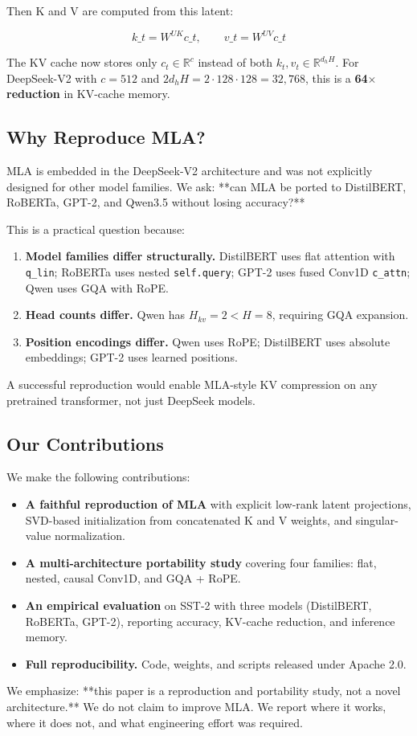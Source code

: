 Then K and V are computed from this latent:

\[
k\_t = W^{UK} c\_t, \qquad v\_t = W^{UV} c\_t
\tag{1.3}
\]

The KV cache now stores only $c_t \in \mathbb{R}^c$ instead of both 
$k_t, v_t \in \mathbb{R}^{d_h H}$. For DeepSeek-V2 with $c = 512$ and 
$2 d_h H = 2 \cdot 128 \cdot 128 = 32{,}768$, this is a \textbf{64$\times$ reduction} in 
KV-cache memory.

\subsection{Why Reproduce MLA?}

MLA is embedded in the DeepSeek-V2 architecture and was not explicitly 
designed for other model families. We ask: **can MLA be ported to 
DistilBERT, RoBERTa, GPT-2, and Qwen3.5 without losing accuracy?**

This is a practical question because:

\begin{enumerate}
\item \textbf{Model families differ structurally.} DistilBERT uses flat attention
  with \texttt{q\_lin}; RoBERTa uses nested \texttt{self.query}; GPT-2 uses fused Conv1D
  \texttt{c\_attn}; Qwen uses GQA with RoPE.
\item \textbf{Head counts differ.} Qwen has $H_{kv} = 2 < H = 8$, requiring GQA
  expansion.
\item \textbf{Position encodings differ.} Qwen uses RoPE; DistilBERT uses absolute
  embeddings; GPT-2 uses learned positions.

\end{enumerate}
A successful reproduction would enable MLA-style KV compression on any 
pretrained transformer, not just DeepSeek models.

\subsection{Our Contributions}

We make the following contributions:

\begin{itemize}
\item \textbf{A faithful reproduction of MLA} with explicit low-rank latent
  projections, SVD-based initialization from concatenated K and V weights,
  and singular-value normalization.
\item \textbf{A multi-architecture portability study} covering four families: flat,
  nested, causal Conv1D, and GQA + RoPE.
\item \textbf{An empirical evaluation} on SST-2 with three models (DistilBERT,
  RoBERTa, GPT-2), reporting accuracy, KV-cache reduction, and inference
  memory.
\item \textbf{Full reproducibility.} Code, weights, and scripts released under
  Apache 2.0.

\end{itemize}
We emphasize: **this paper is a reproduction and portability study, not a 
novel architecture.** We do not claim to improve MLA. We report where it 
works, where it does not, and what engineering effort was required.

